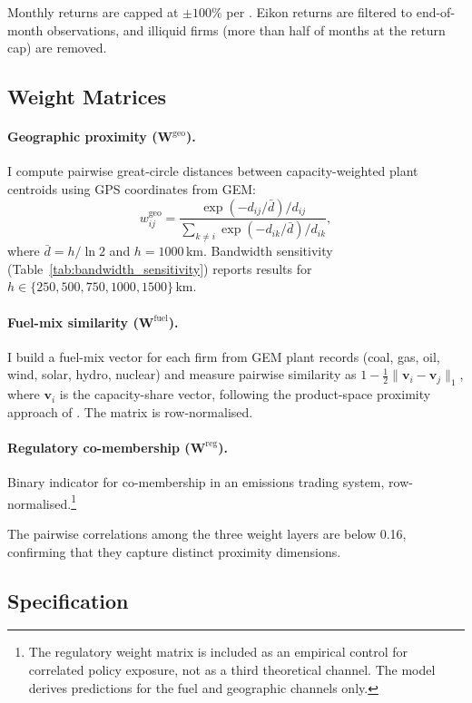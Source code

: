 \documentclass[12pt,a4paper]{article}
\newcommand{\bW}{\mathbf{W}}
\begin{document}
Monthly returns are capped at $\pm 100\%$ per \citet{IncePorter2006}. Eikon returns are filtered to end-of-month observations, and illiquid firms (more than half of months at the return cap) are removed.

\subsection{Weight Matrices}\label{sec:weights}

\paragraph{Geographic proximity ($\bW^{\mathrm{geo}}$).} I compute pairwise great-circle distances between capacity-weighted plant centroids using GPS coordinates from GEM:
\[
  w^{\text{geo}}_{ij} = \frac{\exp(-d_{ij}/\bar{d})/d_{ij}}{\sum_{k\neq i}\exp(-d_{ik}/\bar{d})/d_{ik}},
\]
where $\bar{d} = h/\ln 2$ and $h = 1000$\,km. Bandwidth sensitivity (Table~\ref{tab:bandwidth_sensitivity}) reports results for $h \in \{250, 500, 750, 1000, 1500\}$\,km.

\paragraph{Fuel-mix similarity ($\bW^{\mathrm{fuel}}$).} I build a fuel-mix vector for each firm from GEM plant records (coal, gas, oil, wind, solar, hydro, nuclear) and measure pairwise similarity as $1 - \tfrac{1}{2}\lVert \mathbf{v}_i - \mathbf{v}_j \rVert_1$, where $\mathbf{v}_i$ is the capacity-share vector, following the product-space proximity approach of \citet{HobergPhillips2016}. The matrix is row-normalised.

\paragraph{Regulatory co-membership ($\bW^{\mathrm{reg}}$).} Binary indicator for co-membership in an emissions trading system, row-normalised.\footnote{The regulatory weight matrix is included as an empirical control for correlated policy exposure, not as a third theoretical channel. The model derives predictions for the fuel and geographic channels only.}

The pairwise correlations among the three weight layers are below 0.16, confirming that they capture distinct proximity dimensions.

\subsection{Specification}\label{sec:specification}
\end{document}
